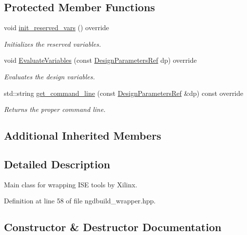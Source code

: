 \subsection*{Protected Member Functions}
\begin{DoxyCompactItemize}
\item 
void \hyperlink{classngdbuild__wrapper_a5be42dfc012dc28753f35ddddd890181}{init\+\_\+reserved\+\_\+vars} () override
\begin{DoxyCompactList}\small\item\em Initializes the reserved variables. \end{DoxyCompactList}\item 
void \hyperlink{classngdbuild__wrapper_acda360ce75b71e1056a3e30841649f0c}{Evaluate\+Variables} (const \hyperlink{DesignParameters_8hpp_ae36bb1c4c9150d0eeecfe1f96f42d157}{Design\+Parameters\+Ref} dp) override
\begin{DoxyCompactList}\small\item\em Evaluates the design variables. \end{DoxyCompactList}\item 
std\+::string \hyperlink{classngdbuild__wrapper_a9ce156e74518cda8ec42ff2e5bc43237}{get\+\_\+command\+\_\+line} (const \hyperlink{DesignParameters_8hpp_ae36bb1c4c9150d0eeecfe1f96f42d157}{Design\+Parameters\+Ref} \&dp) const override
\begin{DoxyCompactList}\small\item\em Returns the proper command line. \end{DoxyCompactList}\end{DoxyCompactItemize}
\subsection*{Additional Inherited Members}


\subsection{Detailed Description}
Main class for wrapping I\+SE tools by Xilinx. 

Definition at line 58 of file ngdbuild\+\_\+wrapper.\+hpp.



\subsection{Constructor \& Destructor Documentation}
\mbox{\label{classngdbuild__wrapper_a24d1db56f6ac9df37c9fba5edbaa170b}} 
